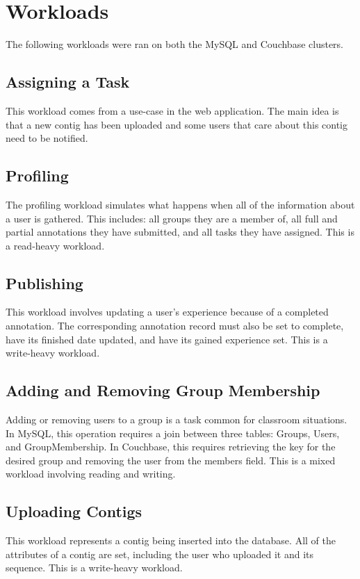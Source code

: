 \documentclass[]{IEEEtran}
\begin{document}
\clearpage

\section{Workloads}
The following workloads were ran on both the MySQL and Couchbase clusters.

\subsection{Assigning a Task}
This workload comes from a use-case in the web application. The main idea is that a new contig has been uploaded and some users that care about this contig need to be notified. 

\subsection{Profiling}
The profiling workload simulates what happens when all of the information about a user is gathered. This includes: all groups they are a member of, all full and partial annotations they have submitted, and all tasks they have assigned. This is a read-heavy workload.

\subsection{Publishing}
This workload involves updating a user's experience because of a completed annotation. The corresponding annotation record must also be set to complete, have its finished date updated, and have its gained experience set. This is a write-heavy workload.

\subsection{Adding and Removing Group Membership}
Adding or removing users to a group is a task common for classroom situations. In MySQL, this operation requires a join between three tables: Groups, Users, and GroupMembership. In Couchbase, this requires retrieving the key for the desired group and removing the user from the members field. This is a mixed workload involving reading and writing.

\subsection{Uploading Contigs}
This workload represents a contig being inserted into the database. All of the attributes of a contig are set, including the user who uploaded it and its sequence. This is a write-heavy workload.
\end{document}
